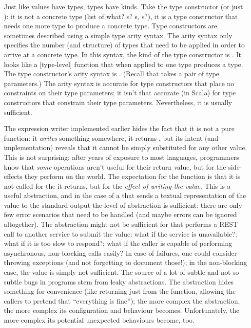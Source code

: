 \documentclass[10 pt]{article}
\begin{document}
Just like values have types, types have kinds. Take the type constructor  (or just ): it is not a concrete type (list of what? s? s, s?), it is a type constructor that needs one more type to produce a concrete type. Type constructors are sometimes described using a simple type arity syntax. The arity syntax only specifies the number (and structure) of types that need to be applied in order to arrive at a concrete type. In this syntax, the kind of the  type constructor is \pcode{* -> *}. It looks like a [type-level] function that when applied to one type produces a type. The  type constructor's arity syntax is \pcode{(*, *) -> *}. (Recall that  takes a pair of type parameters.) The arity syntax is accurate for type constructors that place no constraints on their type parameters; it isn't that accurate (in Scala) for type constructors that constrain their type parameters. Nevertheless, it is usually sufficient.

The expression writer implemented earlier hides the fact that it is not a pure function: it \emph{writes} something somewhere, it returns , but its intent (and implementation) reveals that it cannot be simply substituted for any other \pcode{()} value. This is not surprising: after years of exposure to most languages, programmers know that \emph{some} operations aren't useful for their return value, but for the side-effects they perform on the world. The expectation for the  function is that it is not called for the \pcode{()} it returns, but for the \emph{effect of writing the value}. This is a useful abstraction, and in the case of a  that sends a textual representation of the value to the standard output the level of abstraction is sufficient: there are only few error scenarios that need to be handled (and maybe errors can be ignored altogether). The abstraction might not be sufficient for  that performs a REST call to another service to submit the value: what if the service is unavailable?; what if it is too slow to respond?; what if the caller is capable of performing asynchronous, non-blocking calls easily? In case of failures, one could consider throwing exceptions (and not forgetting to document those!); in the non-blocking case, the value \pcode{()} is simply not sufficient. The source of a lot of subtle and not-so-subtle bugs in programs stem from leaky abstractions. The abstraction hides something for convenience (like returning just \pcode{()} from the  function, allowing the callers to pretend that ``everything is fine''); the more complex the abstraction, the more complex its configuration and behaviour becomes. Unfortunately, the more complex its potential unexpected behaviours become, too.
\end{document}
